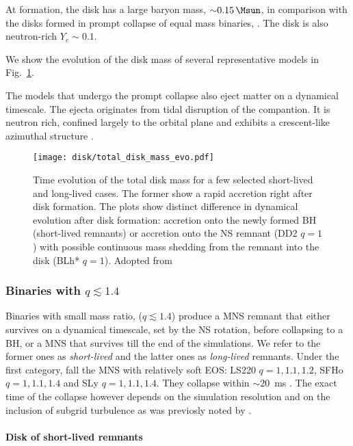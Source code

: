 At formation, the disk has a large baryon mass, ${\sim}0.15\,\Msun$, in comparison with the disks formed in prompt collapse of equal mass binaries, \citep[\eg][]{Radice:2018pdn}. 
The disk is also neutron-rich $Y_e\sim 0.1$.

We show the evolution of the disk mass of several representative models in Fig.~\ref{fig:disk_mass_evo}.

The models that undergo the prompt collapse also eject matter on a dynamical timescale. The ejecta originates from tidal disruption of the compantion. It is neutron rich, confined largely to the orbital plane and exhibits a crescent-like azimuthal structure \citep{Bernuzzi:2020txg}.

\begin{figure}[t]
    \centering 
    \texttt{[image: disk/total\_disk\_mass\_evo.pdf]}
    \caption{Time evolution of the total disk mass for a few selected
        short-lived and long-lived cases. The former show a rapid 
        accretion right after disk formation. The plots show
        distinct difference in dynamical evolution after disk formation: accretion onto
        the newly formed BH (short-lived remnants) or accretion onto the NS
        remnant (DD2 $q=1$) with possible continuous mass shedding from the remnant
        into the disk (BLh* $q=1$). Adopted from \citet{Nedora:2020pak}
    } 
    \label{fig:disk_mass_evo}
\end{figure}


\subsubsection{Binaries with $q\lesssim1.4$}

Binaries with small mass ratio, ($q\lesssim1.4$) produce a \ac{MNS} remnant
that either survives on a dynamical timescale, set by the \ac{NS} rotation, before
collapsing to a \ac{BH}, or a \ac{MNS} that survives till the end of the simulations.
We refer to the former ones as \textit{short-lived} and the latter ones as 
\textit{long-lived} remnants.
Under the first category, fall the \ac{MNS} with relatively soft \ac{EOS}:
LS220 $q=1,1.1,1.2$, SFHo $q=1,1.1,1.4$ and SLy $q=1,1.1,1.4$. 
They collapse within $\sim20$~ms \pmerg. 
The exact time of the collapse however depends on the simulation resolution 
and on the inclusion of subgrid turbulence as was previosly noted by \citet{Radice:2017zta}.


\paragraph*{Disk of short-lived remnants}

